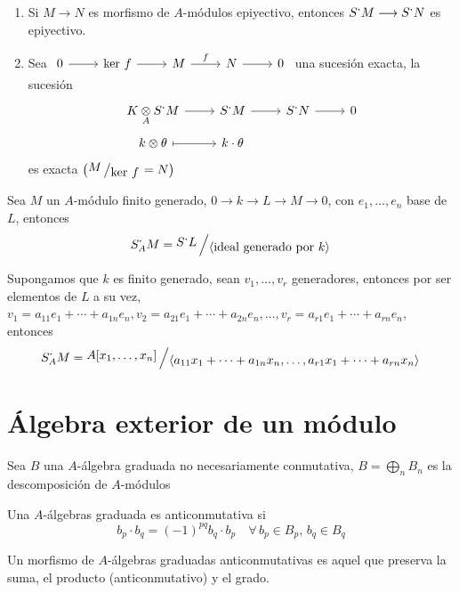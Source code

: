     \begin{ejer}
    \begin{enumerate}
        \item Si $M \longrightarrow N$ es morfismo de $A$-m\'odulos epiyectivo, entonces $S^{\boldsymbol{\cdot}}M \longrightarrow S^{\boldsymbol{\cdot}}N$ es epiyectivo.
        \item Sea $\bt 0 \arrow{r} & \ker\, f \arrow{r} & M \arrow{r}{f} & N \arrow{r} & 0 \et$ una sucesi\'on exacta, 
        la sucesi\'on
        $$\bt K\underset{A}{\otimes} S^{\bdot}M \arrow{r} & S^{\bdot}M \arrow{r} & S^{\bdot} N \arrow{r} & 0 \\[-5mm] k \otimes \theta \arrow[mapsto]{r} & k \cdot \theta \et$$ es exacta $\left(\modulo{M}{\ker\, f} = N\right)$
    \end{enumerate}        
    \end{ejer} 
    \begin{ejem}
        Sea $M$ un $A$-m\'odulo finito generado, $0 \longrightarrow k \longrightarrow L \longrightarrow M \longrightarrow 0$, con $e_1, \ldots, e_n$ base de $L$, entonces
        $$S^{\bdot}_A M = \modulo{S^{\bdot}L}{\langle \text{ideal generado por }k \rangle}$$

        Supongamos que $k$ es finito generado, sean $v_1, \ldots, v_r$ generadores, entonces por ser elementos de $L$ 
        a su vez, $v_1 = a_{11}  e_1 + \cdots + a_{1n} e_n, v_2 = a_{21}  e_1 + \cdots + a_{2n} e_n, \ldots, v_r = a_{r1} e_1 + \cdots + a_{rn} e_n$, entonces
        $$S^{\bdot}_A M = \modulo{A[x_1,\ldots, x_n]}{\langle a_{11}x_1+\cdots+a_{1n}x_n, \ldots,  a_{r1}x_1+\cdots+a_{rn}x_n \rangle}$$
    \end{ejem}
\section{\'Algebra exterior de un m\'odulo}

Sea $B$ una $A$-\'algebra graduada no necesariamente conmutativa, $\displaystyle B = \bigoplus_n B_n$ es la descomposici\'on de $A$-m\'odulos
\begin{defi}
    Una $A$-\'algebras graduada es anticonmutativa si $$b_p \cdot b_q = (-1)^{pq} b_q \cdot b_p \quad \forall \, b_p \in B_p, \, b_q \in B_q$$
\end{defi}
\begin{defi}
    Un morfismo de $A$-\'algebras graduadas anticonmutativas es aquel que preserva la suma, el producto (anticonmutativo) y el grado.
\end{defi}

